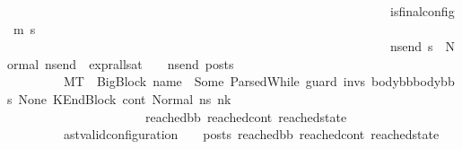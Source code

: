 \begin{isabellebody}
\ \ \ \ \ \ \ \ \ \ \ \ \ \ \ \ \ \ \ \ \ \ \ \ \ \ \ \ \ \ \ \ \ \ \ \ \ \ \ \ \ \ \ \ \ \ \ \ \ \ \ \ \ \ \ \ \ \ \ \ \ is{\isacharunderscore}{\kern0pt}final{\isacharunderscore}{\kern0pt}config\ {\isacharparenleft}{\kern0pt}m{\isacharprime}{\kern0pt}{\isacharcomma}{\kern0pt}\ s{\isacharprime}{\kern0pt}{\isacharparenright}{\kern0pt}\ {\isasymlongrightarrow}\ \isanewline
\ \ \ \ \ \ \ \ \ \ \ \ \ \ \ \ \ \ \ \ \ \ \ \ \ \ \ \ \ \ \ \ \ \ \ \ \ \ \ \ \ \ \ \ \ \ \ \ \ \ \ \ \ \ \ \ \ \ \ \ \ {\isacharparenleft}{\kern0pt}{\isasymforall}ns{\isacharunderscore}{\kern0pt}end{\isachardot}{\kern0pt}\ s{\isacharprime}{\kern0pt}\ {\isacharequal}{\kern0pt}\ Normal\ ns{\isacharunderscore}{\kern0pt}end\ {\isasymlongrightarrow}\ {\isacharparenleft}{\kern0pt}expr{\isacharunderscore}{\kern0pt}all{\isacharunderscore}{\kern0pt}sat\ {\isasymLambda}\ {\isasymGamma}\ {\isasymOmega}\ ns{\isacharunderscore}{\kern0pt}end{\isacharparenright}{\kern0pt}\ posts{\isacharparenright}{\kern0pt}{\isacharparenright}{\kern0pt}{\isacharparenright}{\kern0pt}\ {\isasymLongrightarrow}\isanewline
\ \ \ \ \ \ \ \ \ M{\isacharcomma}{\kern0pt}{\isasymLambda}{\isacharcomma}{\kern0pt}{\isasymGamma}{\isacharcomma}{\kern0pt}{\isasymOmega}{\isacharcomma}{\kern0pt}T\ {\isasymturnstile}\ {\isacharparenleft}{\kern0pt}{\isacharparenleft}{\kern0pt}BigBlock\ name\ {\isacharbrackleft}{\kern0pt}{\isacharbrackright}{\kern0pt}\ {\isacharparenleft}{\kern0pt}Some\ {\isacharparenleft}{\kern0pt}ParsedWhile\ guard\ invs\ {\isacharparenleft}{\kern0pt}body{\isacharunderscore}{\kern0pt}bb{}{\isacharhash}{\kern0pt}body{\isacharunderscore}{\kern0pt}bbs{\isacharparenright}{\kern0pt}{\isacharparenright}{\kern0pt}{\isacharparenright}{\kern0pt}\ None{\isacharparenright}{\kern0pt}{\isacharcomma}{\kern0pt}\ KEndBlock\ cont{}{\isacharcomma}{\kern0pt}\ Normal\ ns{}{\isacharparenright}{\kern0pt}\ {\isacharminus}{\kern0pt}n{\isasymlongrightarrow}{\isacharcircum}{\kern0pt}k\ \isanewline
\ \ \ \ \ \ \ \ \ \ \ \ \ \ \ \ \ \ \ \ \ \ {\isacharparenleft}{\kern0pt}reached{\isacharunderscore}{\kern0pt}bb{\isacharcomma}{\kern0pt}\ reached{\isacharunderscore}{\kern0pt}cont{\isacharcomma}{\kern0pt}\ reached{\isacharunderscore}{\kern0pt}state{\isacharparenright}{\kern0pt}\ {\isasymLongrightarrow}\ \isanewline
\ \ \ \ \ \ \ \ \ {\isacharparenleft}{\kern0pt}ast{\isacharunderscore}{\kern0pt}valid{\isacharunderscore}{\kern0pt}configuration\ {\isasymLambda}\ {\isasymGamma}\ {\isasymOmega}\ posts\ reached{\isacharunderscore}{\kern0pt}bb\ reached{\isacharunderscore}{\kern0pt}cont\ reached{\isacharunderscore}{\kern0pt}state{\isacharparenright}{\kern0pt}{\isachardoublequoteclose}\isanewline

\end{isabellebody}
